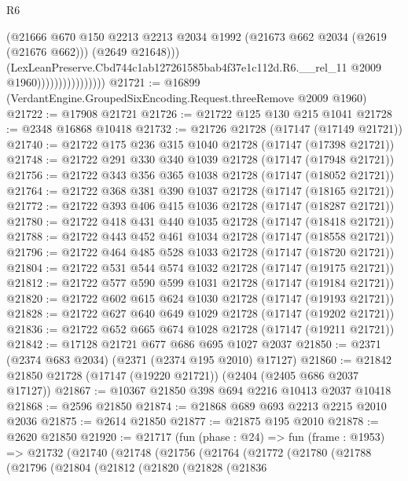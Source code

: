 \begin{lexlean}{R6}
\begin{coremodule}
                                    (@21666
                                      @670
                                      @150
                                      @2213
                                      @2213
                                      @2034
                                      @1992
                                      (@21673 @662 @2034 (@2619 (@21676 @662)))
                                      (@2649 @21648)))
                                  (LexLeanPreserve.Cbd744c1ab127261585bab4f37e1c112d.R6.__rel_11
                                    @2009
                                    @1960))))))))))))))))
@21721 := @16899 (VerdantEngine.GroupedSixEncoding.Request.threeRemove @2009 @1960)
@21722 := @17908 @21721
@21726 := @21722 @125 @130 @215 @1041
@21728 := @2348 @16868 @10418
@21732 := @21726 @21728 (@17147 (@17149 @21721))
@21740 := @21722 @175 @236 @315 @1040 @21728 (@17147 (@17398 @21721))
@21748 := @21722 @291 @330 @340 @1039 @21728 (@17147 (@17948 @21721))
@21756 := @21722 @343 @356 @365 @1038 @21728 (@17147 (@18052 @21721))
@21764 := @21722 @368 @381 @390 @1037 @21728 (@17147 (@18165 @21721))
@21772 := @21722 @393 @406 @415 @1036 @21728 (@17147 (@18287 @21721))
@21780 := @21722 @418 @431 @440 @1035 @21728 (@17147 (@18418 @21721))
@21788 := @21722 @443 @452 @461 @1034 @21728 (@17147 (@18558 @21721))
@21796 := @21722 @464 @485 @528 @1033 @21728 (@17147 (@18720 @21721))
@21804 := @21722 @531 @544 @574 @1032 @21728 (@17147 (@19175 @21721))
@21812 := @21722 @577 @590 @599 @1031 @21728 (@17147 (@19184 @21721))
@21820 := @21722 @602 @615 @624 @1030 @21728 (@17147 (@19193 @21721))
@21828 := @21722 @627 @640 @649 @1029 @21728 (@17147 (@19202 @21721))
@21836 := @21722 @652 @665 @674 @1028 @21728 (@17147 (@19211 @21721))
@21842 := @17128 @21721 @677 @686 @695 @1027 @2037
@21850 := @2371 (@2374 @683 @2034) (@2371 (@2374 @195 @2010) @17127)
@21860 := @21842 @21850 @21728 (@17147 (@19220 @21721)) (@2404 (@2405 @686 @2037 @17127))
@21867 := @10367 @21850 @398 @694 @2216 @10413 @2037 @10418
@21868 := @2596 @21850
@21874 := @21868 @689 @693 @2213 @2215 @2010 @2036
@21875 := @2614 @21850
@21877 := @21875 @195 @2010
@21878 := @2620 @21850
@21920 := @21717
    (fun (phase : @24) =>
    fun (frame : @1953) =>
    @21732
      (@21740
        (@21748
          (@21756
            (@21764
              (@21772
                (@21780
                  (@21788
                    (@21796
                      (@21804
                        (@21812
                          (@21820
                            (@21828
                              (@21836

\end{coremodule}
\end{lexlean}
